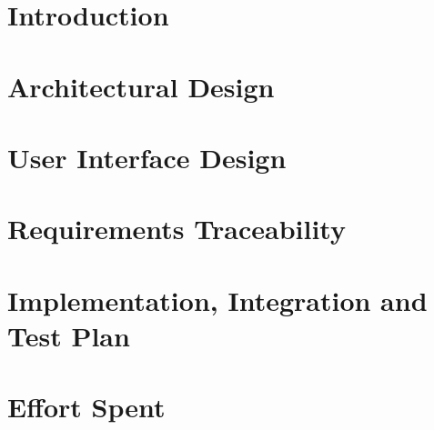 \documentclass[a4paper,11pt]{report}
\begin{document}
\clearpage
\chapter{{Introduction}}
\label{sect:introduction}


\clearpage
\chapter{{Architectural Design}}
\label{sect:architectural_design}


\clearpage
\chapter{{User Interface Design}}
\label{sect:user_interface_design}


\clearpage
\chapter{{Requirements Traceability}}
\label{sect:requirements_traceability}

\clearpage
\chapter{{Implementation, Integration and Test Plan}}
\label{sect:implementation_integration_testplan}


\clearpage
\chapter{Effort Spent}
\label{sect:effort}

\end{document}

